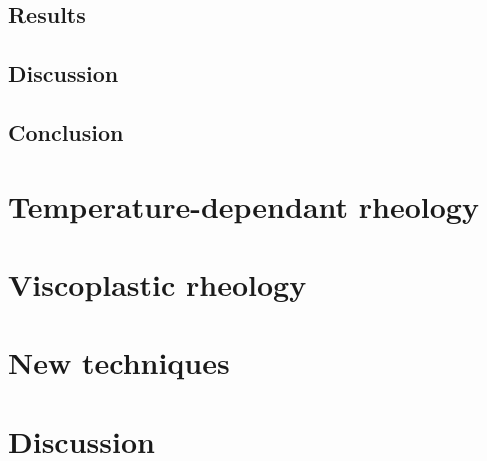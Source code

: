 \documentclass[a4paper,11pt,oneside]{book}
\begin{document}
\subsection{Results}

\subsection{Discussion}

\subsection{Conclusion}

\section{Temperature-dependant rheology}

\section{Viscoplastic rheology}

\section{New techniques}

\section{Discussion}



\end{document}

